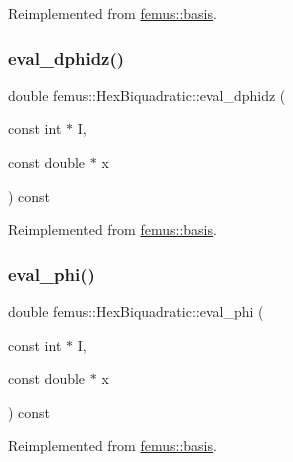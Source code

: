 Reimplemented from \mbox{\hyperlink{classfemus_1_1basis_a2819fac9aae797156b9efec8a0b85cc1}{femus\+::basis}}.

\mbox{\label{classfemus_1_1_hex_biquadratic_a1dbed34250925ec85764871142ce3597}} 
\subsubsection{\texorpdfstring{eval\+\_\+dphidz()}{eval\_dphidz()}}
{\footnotesize\ttfamily double femus\+::\+Hex\+Biquadratic\+::eval\+\_\+dphidz (\begin{DoxyParamCaption}\item[{const int $\ast$}]{I,  }\item[{const double $\ast$}]{x }\end{DoxyParamCaption}) const\hspace{0.3cm}{\ttfamily [virtual]}}



Reimplemented from \mbox{\hyperlink{classfemus_1_1basis_affd9927f6e25e264108219d862b8cb3d}{femus\+::basis}}.

\mbox{\label{classfemus_1_1_hex_biquadratic_aaf08e83ba3ba1eb6f5e27cfafd1af391}} 
\subsubsection{\texorpdfstring{eval\+\_\+phi()}{eval\_phi()}}
{\footnotesize\ttfamily double femus\+::\+Hex\+Biquadratic\+::eval\+\_\+phi (\begin{DoxyParamCaption}\item[{const int $\ast$}]{I,  }\item[{const double $\ast$}]{x }\end{DoxyParamCaption}) const\hspace{0.3cm}{\ttfamily [virtual]}}



Reimplemented from \mbox{\hyperlink{classfemus_1_1basis_a89b0797cdccffae5ff6d059b32016ae5}{femus\+::basis}}.

